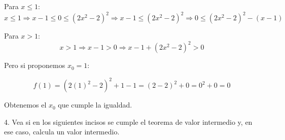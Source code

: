 \documentclass[12pt]{article}
\begin{document}
\begin{enumerate}[\hspace{9px} a)]
    Para $x \leq 1$:
    \[x \leq 1 \Rightarrow x-1 \leq 0 \leq (2x^2-2)^2 \Rightarrow x-1 \leq (2x^2-2)^2 \Rightarrow 0 \leq (2x^2-2)^2-(x-1)\]

    Para $x>1$:
    \[x>1 \Rightarrow x-1>0 \Rightarrow x-1+(2x^2-2)^2>0\]

    Pero si proponemos $x_0=1$:

    \[f(1)=(2(1)^2-2)^2+1-1=(2-2)^2+0=0^2+0=0\]

    Obtenemos el $x_0$ que cumple la igualdad.\\

\end{enumerate}

4. Vea si en los siguientes incisos se cumple el teorema de valor intermedio y, en ese caso, calcula un valor intermedio.
\end{document}
